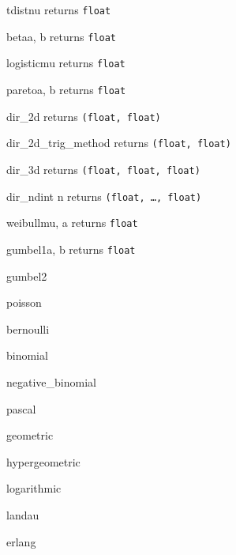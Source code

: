 \begin{methoddesc}{tdist}{nu}
  \hfill returns {\tt float}
\end{methoddesc}
\begin{methoddesc}{beta}{a, b}
  \hfill returns {\tt float}
\end{methoddesc}
\begin{methoddesc}{logistic}{mu}
  \hfill returns {\tt float}
\end{methoddesc}
\begin{methoddesc}{pareto}{a, b}
  \hfill returns {\tt float}
\end{methoddesc}
\begin{methoddesc}{dir\_2d}{}
  \hfill returns {\tt (float, float)}
\end{methoddesc}
\begin{methoddesc}{dir\_2d\_trig\_method}{}
  \hfill returns {\tt (float, float)}
\end{methoddesc}
\begin{methoddesc}{dir\_3d}{}
  \hfill returns {\tt (float, float, float)}
\end{methoddesc}
\begin{methoddesc}{dir\_nd}{int n}
  \hfill returns {\tt (float, \dots, float)}
\end{methoddesc}
\begin{methoddesc}{weibull}{mu, a}
  \hfill returns {\tt float}
\end{methoddesc}
\begin{methoddesc}{gumbel1}{a, b}
  \hfill returns {\tt float}
\end{methoddesc}
\begin{methoddesc}{gumbel2}{}
\end{methoddesc}
\begin{methoddesc}{poisson}{}
\end{methoddesc}
\begin{methoddesc}{bernoulli}{}
\end{methoddesc}
\begin{methoddesc}{binomial}{}
\end{methoddesc}
\begin{methoddesc}{negative\_binomial}{}
\end{methoddesc}
\begin{methoddesc}{pascal}{}
\end{methoddesc}
\begin{methoddesc}{geometric}{}
\end{methoddesc}
\begin{methoddesc}{hypergeometric}{}
\end{methoddesc}
\begin{methoddesc}{logarithmic}{}
\end{methoddesc}
\begin{methoddesc}{landau}{}
\end{methoddesc}
\begin{methoddesc}{erlang}{}
\end{methoddesc}


